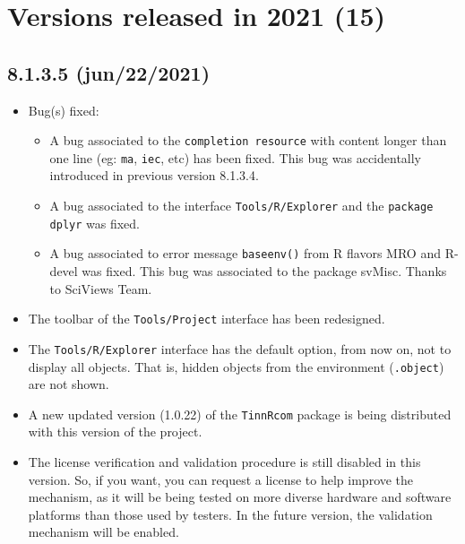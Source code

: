 
\hypertarget{2021}{}
\section{Versions released in 2021 (15)}

\subsection*{8.1.3.5 (jun/22/2021)}
\begin{itemize}
  \item Bug(s) fixed: 
    \begin{itemize}
      \item A bug associated to the \texttt{completion resource} with content longer than one line 
        (eg: \texttt{ma}, \texttt{iec}, etc)
        has been fixed. This bug was accidentally introduced in previous version 8.1.3.4.
      \item A bug associated to the interface \texttt{Tools/R/Explorer} and the \texttt{package dplyr} was fixed.
      \item A bug associated to error message \texttt{baseenv()} from R flavors MRO and R-devel was fixed.
        This bug was associated to the package svMisc. Thanks to SciViews Team.
    \end{itemize}
  \item The toolbar of the \texttt{Tools/Project} interface has been redesigned.
  \item The \texttt{Tools/R/Explorer} interface has the default option, from now on, not to display all objects.
    That is, hidden objects from the environment (\texttt{.object}) are not shown.
  \item A new updated version (1.0.22) of the \texttt{TinnRcom} package is being distributed with this version 
    of the project.
  \item The license verification and validation procedure is still disabled in this version.
    So, if you want, you can request a license to help improve the mechanism,
    as it will be being tested on more diverse hardware and software platforms than
    those used by testers. In the future version, the validation mechanism will be enabled.
\end{itemize}

